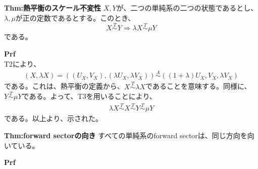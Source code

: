 \documentclass[a4paper,11pt]{jsarticle}
\begin{document}
\begin{itembox}[l]{\textbf{Thm:熱平衡のスケール不変性}}
    $X,Y$が、二つの単純系の二つの状態であるとし、$\lambda,\mu$が正の定数であるとする。このとき、
    \begin{equation}
        X \overset{T}{\sim} Y \Rightarrow \lambda X \overset{T}{\sim} \mu Y
    \end{equation}
    である。
\end{itembox}
\textbf{Prf}\\
T2により、
\begin{align}
    (X,\lambda X) =((U_X,V_X),(\lambda U_X,\lambda V_X)) \overset{A}{\sim} ((1+\lambda)U_X,V_X,\lambda V_X) 
\end{align}
である。これは、熱平衡の定義から、$X \overset{T}{\sim} \lambda X$であることを意味する。同様に、$Y \overset{T}{\sim} \mu Y$である。よって、T3を用いることにより、
\begin{align}
    \lambda X \overset{T}{\sim} X \overset{T}{\sim} Y \overset{T}{\sim} \mu Y
\end{align}
である。以上より、示された。\hfill\qedsymbol\\

\begin{itembox}[l]{\textbf{Thm:forward sectorの向き}}
すべての単純系のforward sectorは、同じ方向を向いている。
\end{itembox}
\textbf{Prf}\\
\end{document}
